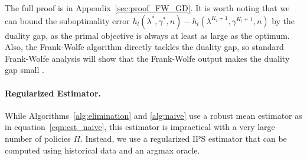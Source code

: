 \documentclass{article}
\newcommand{\1}{\mathbf{1}}
\begin{document}
The full proof is in Appendix~\ref{sec:proof_FW_GD}. It is worth noting that we can bound the suboptimality error $h_l(\lambda^*,\gamma^*,n)-h_l(\lambda^{K_l+1},\gamma^{K_l+1},n)$ by the duality gap, as the primal objective is always at least as large as the optimum. Also, the Frank-Wolfe algorithm directly tackles the duality gap, so standard Frank-Wolfe analysis will show that the Frank-Wolfe output makes the duality gap small \cite{pedregosa2020linearly}. 



\paragraph{Regularized Estimator.}  While Algorithms~\ref{alg:elimination} and \ref{alg:naive} use a robust mean estimator as in equation~\eqref{eqn:est_naive}, this estimator is impractical with a very large number of policies $\Pi$. 
Instead, we use a regularized IPS estimator that can be computed using historical data and an argmax oracle. 
\end{document}

